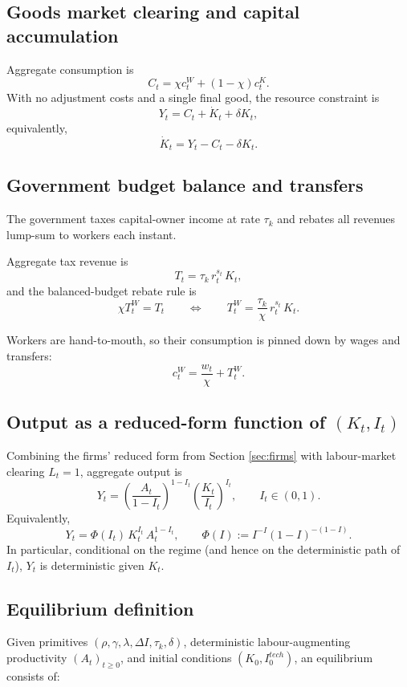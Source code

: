 \documentclass{article}
\begin{document}
\subsection{Goods market clearing and capital accumulation}

Aggregate consumption is
$$
C_t = \chi c^W_t + (1-\chi)c^K_t.
$$
With no adjustment costs and a single final good, the resource constraint is
$$
Y_t = C_t + \dot K_t + \delta K_t,
$$
equivalently,
$$
\dot K_t = Y_t - C_t - \delta K_t.
$$

\subsection{Government budget balance and transfers}

The government taxes capital-owner income at rate $\tau_k$ and rebates all revenues lump-sum to workers each instant.

Aggregate tax revenue is
$$
T_t = \tau_k\, r_t^{s_t}\, K_t,
$$
and the balanced-budget rebate rule is
$$
\chi T^W_t = T_t
\qquad\Longleftrightarrow\qquad
T^W_t = \frac{\tau_k}{\chi}\, r_t^{s_t}\, K_t.
$$

Workers are hand-to-mouth, so their consumption is pinned down by wages and transfers:
$$
c^W_t = \frac{w_t}{\chi} + T^W_t.
$$

\subsection{Output as a reduced-form function of $(K_t,I_t)$}

Combining the firms' reduced form from Section \ref{sec:firms} with labour-market clearing $L_t=1$, aggregate output is
$$
Y_t
=
\left(\frac{A_t}{1-I_t}\right)^{1-I_t}
\left(\frac{K_t}{I_t}\right)^{I_t},
\qquad I_t \in (0,1).
$$
Equivalently,
$$
Y_t = \Phi(I_t)\,K_t^{I_t}\,A_t^{1-I_t},
\qquad
\Phi(I) := I^{-I}(1-I)^{-(1-I)}.
$$
In particular, conditional on the regime (and hence on the deterministic path of $I_t$), $Y_t$ is deterministic given $K_t$.

\subsection{Equilibrium definition}

Given primitives $(\rho,\gamma,\lambda,\Delta I,\tau_k,\delta)$, deterministic labour-augmenting productivity $(A_t)_{t\ge 0}$, and initial conditions $(K_0,I^{tech}_0)$, an equilibrium consists of:
\end{document}
